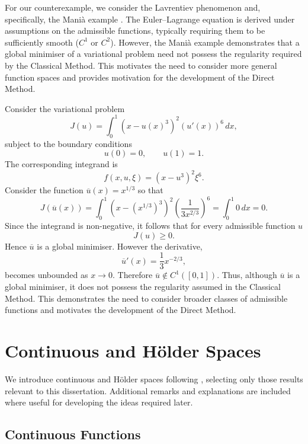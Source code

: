 For our counterexample, we consider the Lavrentiev phenomenon and, specifically, the Mani\`a example \cite[p.~70]{dacorogna}. The Euler--Lagrange equation is derived under assumptions on the admissible functions, typically requiring them to be sufficiently smooth ($C^1$ or $C^2$). However, the Mani\`a example demonstrates that a global minimiser of a variational problem need not possess the regularity required by the Classical Method. This motivates the need to consider more general function spaces and provides motivation for the development of the Direct Method.

\begin{example}
\label{ex:Mania}
Consider the variational problem
\[
J(u)=\int_0^1 (x-u(x)^3)^2(u'(x))^6\,dx,
\]
subject to the boundary conditions 
\[
u(0) = 0, \qquad u(1) = 1.
\] 
The corresponding integrand is
\[
f(x,u,\xi) = (x-u^3)^2\xi^6.
\]
Consider the function $\overline{u}(x) = x^{1/3}$ so that
\[
J(\overline{u}(x)) = \int_0^1 (x - (x^{1/3})^3)^2\left(\frac{1}{3x^{2/3}}\right)^6 = \int_0^1 0 \, dx = 0.  
\]
Since the integrand is non-negative, it follows that for every admissible function $u$
\[
J(u) \geq 0.
\]
Hence $\overline{u}$ is a global minimiser. However the derivative,
\[
\overline{u}'(x)= \frac{1}{3}x^{-2/3},
\]
becomes unbounded as $x \rightarrow 0$. Therefore $\overline{u} \notin C^1([0,1])$. Thus, although $\overline{u}$ is a global minimiser, it does not possess the regularity assumed in the Classical Method. This demonstrates the need to consider broader classes of admissible functions and motivates the development of the Direct Method.
\end{example}


\section{Continuous and H\"older Spaces}

We introduce continuous and H\"older spaces following \cite[Section 1.2, p.~14]{dacorogna}, selecting only those results relevant to this dissertation. Additional remarks and explanations are included where useful for developing the ideas required later.

\subsection{Continuous Functions}

